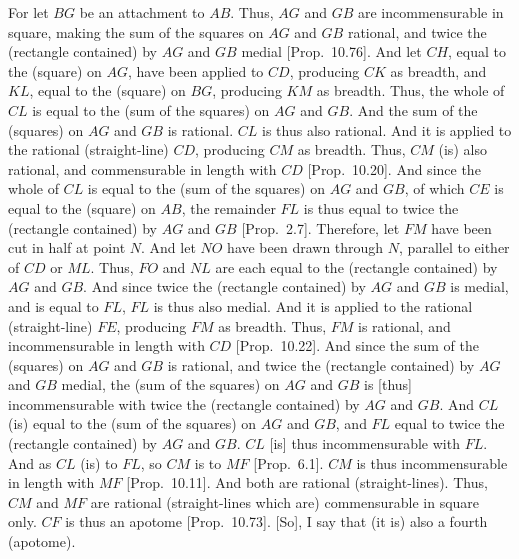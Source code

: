 \begin{Parallel}{}{}
{For let $BG$ be an attachment to $AB$. Thus, $AG$ and $GB$ are incommensurable in square, making the sum of the squares on $AG$ and $GB$ rational, and twice the (rectangle contained) by $AG$ and $GB$ medial [Prop.~10.76]. And let $CH$,
equal to the (square) on $AG$, have been applied to $CD$, producing
$CK$ as breadth, and $KL$, equal to the (square) on $BG$, producing
$KM$ as breadth. Thus, the whole of $CL$ is equal to the (sum of the
squares) on $AG$ and $GB$. And the sum of the (squares) on $AG$ and
$GB$ is rational. $CL$ is thus also rational. And it is applied to the
rational (straight-line) $CD$, producing $CM$ as breadth. Thus, $CM$
(is) also rational, and commensurable in length with $CD$ [Prop.~10.20]. And since the whole of $CL$
is equal to the (sum of the squares) on $AG$ and $GB$, of which
$CE$ is equal to the (square) on $AB$, the remainder $FL$ is thus
equal to twice the (rectangle contained) by $AG$ and $GB$ [Prop.~2.7]. Therefore, let $FM$ have been cut in
half at point $N$. And let $NO$ have been drawn through $N$, parallel
to either of $CD$ or $ML$. Thus, $FO$ and $NL$ are each
equal to the (rectangle contained) by $AG$ and $GB$. And since
twice the (rectangle contained) by $AG$ and $GB$ is medial, and is equal
to $FL$, $FL$ is thus also medial. And it is applied to the rational (straight-line) $FE$, producing $FM$ as breadth. Thus, $FM$ is  rational, and incommensurable in length with $CD$ [Prop.~10.22]. And since the sum of the (squares)
on $AG$ and $GB$ is rational, and twice the (rectangle contained) by $AG$
and $GB$ medial, the (sum of the squares) on $AG$ and $GB$
is [thus] incommensurable with twice the (rectangle contained)
by $AG$ and $GB$. And $CL$ (is) equal to the (sum of the squares)
on $AG$ and $GB$, and $FL$ equal to twice the (rectangle contained) by $AG$ and $GB$. $CL$ [is] thus incommensurable with $FL$. And as
$CL$ (is) to $FL$, so $CM$ is to $MF$ [Prop.~6.1]. 
$CM$ is thus incommensurable in length with $MF$ [Prop.~10.11]. And both are rational (straight-lines). 
Thus, $CM$ and $MF$ are rational (straight-lines which are) commensurable
in square only. $CF$ is thus an apotome [Prop.~10.73]. [So], I say that (it is) also
a fourth (apotome).

}
\end{Parallel}
